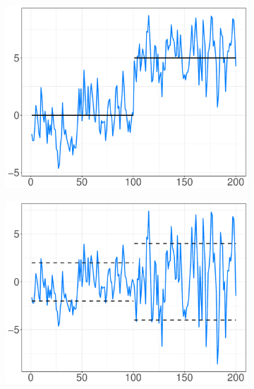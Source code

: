 \documentclass[11pt]{dippg}
\begin{document}
\begin{figure}[!ht]
\begin{subfigure}{.45\textwidth}
 \includegraphics[width=1\linewidth]{images/level-stationary_ts.pdf}
 \caption{}
 \label{fig:level-stationary}
\end{subfigure}
\begin{subfigure}{.45\textwidth}
 \centering
 \includegraphics[width=1\linewidth]{images/heteroscedastic_ts.pdf}
 \caption{}
 \label{fig:heteroscedastic}
\end{subfigure}
\begin{subfigure}{.45\textwidth}
 \centering

\end{subfigure}
\end{figure}
\end{document}
